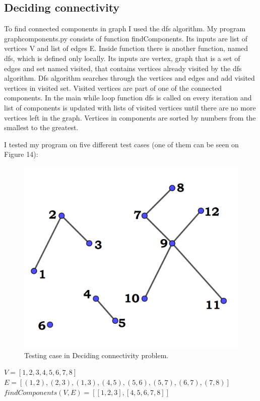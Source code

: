 \documentclass[12pt]{article}
\begin{document}
\subsection{ Deciding connectivity} 
To find connected components in graph I used the dfs algorithm. My program graphcomponents.py consists of function findComponents. Its inputs are list of vertices V and list of edges E. Inside function there is another function, named dfs, which is defined only locally. Its inputs are vertex, graph that is a set of edges and set named visited, that contains vertices already visited by the dfs algorithm. Dfs algorithm searches through the vertices and edges and add visited vertices in visited set. Visited vertices are part of one of the connected components. In the main while loop function dfs is called on every iteration and list of components is updated with lists of visited vertices until there are no more vertices left in the graph. Vertices in components are sorted by numbers from the smallest to the greatest.

\noindent I tested my program on five different test cases (one of them can be seen on Figure 14):  \\

\begin{figure}
	\centering
	\includegraphics[scale=0.30] {graph14}
	\caption{\label{fig:14} Testing case in Deciding connectivity problem.}
\end{figure}

\noindent $V = [1, 2, 3, 4, 5, 6, 7, 8] $ \\
$E = [(1, 2), (2, 3), (1, 3), (4, 5), (5, 6), (5, 7), (6, 7), (7, 8)]$ \\
$findComponents(V, E) = [[1, 2, 3], [4, 5, 6, 7, 8]] $ \\
\end{document}
